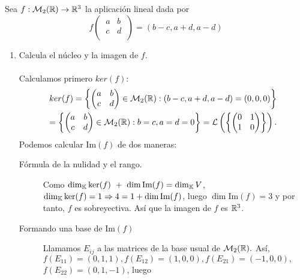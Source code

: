 \documentclass[12pt]{article}
\begin{document}
    \begin{ejercicio}[2.5 puntos] Sea $f : \mathcal{M}_2({\mathbb{R}}) \rightarrow {\mathbb{R}}^3$ la aplicación lineal dada por
    \begin{equation*}
        f\begin{pmatrix}
            \ a & b \ \\
            \ c & d \ \\
        \end{pmatrix} = (b-c, a+d, a-d)
    \end{equation*}
    \begin{enumerate}[label=(\alph*)]
        \item Calcula el núcleo y la imagen de $f$. \\\\
        Calculamos primero $ker(f)$:
        \begin{gather*}
            ker(f) = \left\{
            \begin{pmatrix}
                a & b \\
                c & d \\
            \end{pmatrix} \in \mathcal{M}_2({\mathbb{R}}) : (b-c, a+d, a-d) = (0, 0, 0)\right\} \\
            = \left\{
            \begin{pmatrix}
                a & b \\
                c & d \\
            \end{pmatrix} \in \mathcal{M}_2({\mathbb{R}}) : b = c, a = d = 0\right\} = \mathcal{L}\left(\left\{\begin{pmatrix}
                0 & 1 \\
                1 & 0 \\
            \end{pmatrix} \right\}\right).
        \end{gather*}
        Podemos calcular $\text{Im}(f)$ de dos maneras:
        \begin{description}
            \item[Fórmula de la nulidad y el rango.] Como $\dim_{\mathbb{K}}\ker(f) \ + \ \dim \text{Im}(f) = \dim_{\mathbb{K}} V$,  $\dim_{\mathbb{K}}\ker(f) = 1 \Rightarrow 4 = 1 + \dim \text{Im}(f)$, luego $\dim \text{Im}(f) = 3$ y por tanto, $f$ es sobreyectiva. Así que la imagen de $f$ es ${\mathbb{R}}^3$.
            \item[Formando una base de Im$(f)$] Llamamos $E_{ij}$ a las matrices de la base usual de $\mathcal{M}_2({\mathbb{R}}).$ Así, $f(E_{11}) = (0, 1, 1), f(E_{12}) = (1, 0, 0), f(E_{21}) = (-1, 0, 0),$ $f(E_{22}) = (0, 1, -1)$, luego

\end{description}
\end{enumerate}
\end{ejercicio}
\end{document}
